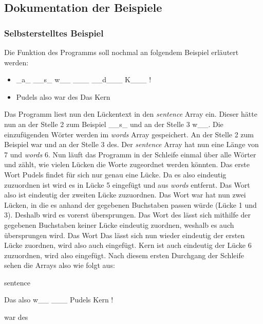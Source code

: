 \documentclass[a4paper, 12pt]{scrartcl}
\begin{document}
\subsection{Dokumentation der Beispiele}

\subsubsection{Selbsterstelltes Beispiel}
Die Funktion des Programms soll nochmal an folgendem Beispiel erläutert werden:
\begin{itemize}
    \item {\_}a{\_} {\_}{\_}s{\_} w{\_}{\_} {\_}{\_}{\_} {\_}{\_}d{\_}{\_}{\_} K{\_}{\_}{\_} !
    \item Pudels also war des Das Kern
\end{itemize}

Das Programm liest nun den Lückentext in den \emph{sentence} Array ein. Dieser hätte nun an der Stelle 2 zum Beispiel {\glqq}\_\_s\_{\grqq} und an der Stelle 3 {\glqq}w\_\_{\grqq}. Die einzufügenden Wörter werden im \emph{words} Array gespeichert. An der Stelle 2 zum Beispiel {\glqq}war{\grqq} und an der Stelle 3 {\glqq}des{\grqq}. Der \emph{sentence} Array hat nun eine Länge von 7 und \emph{words} 6. Nun läuft das Programm in der Schleife einmal über alle Wörter und zählt, wie vielen Lücken die Worte zugeordnet werden könnten. Das erste Wort {\glqq}Pudels{\grqq} findet für sich nur genau eine Lücke. Da es also eindeutig zuzuordnen ist wird es in Lücke 5 eingefügt und  aus  \emph{words} entfernt. Das  Wort {\glqq}also{\grqq} ist  eindeutig  der  zweiten  Lücke zuzuordnen. Das Wort {\glqq}war{\grqq} hat nun zwei Lücken, in die es anhand der gegebenen Buchstaben passen würde (Lücke 1 und 3). Deshalb wird es vorerst übersprungen. Das Wort {\glqq}des{\grqq} lässt sich mithilfe der gegebenen  Buchstaben  keiner  Lücke  eindeutig  zuordnen,  weshalb  es  auch  übersprungen  wird.  Das Wort {\glqq}Das{\grqq} lässt sich nun wieder eindeutig der ersten Lücke zuordnen, wird also auch eingefügt. {\glqq}Kern{\grqq} ist  auch  eindeutig  der  Lücke  6  zuzuordnen,  wird  also  eingefügt.  Nach  diesem  ersten  Durchgang  der Schleife sehen die Arrays also wie folgt aus:

\begin{labeling}{sentence}
    \item [sentence] Das also w{\_}{\_} {\_}{\_}{\_} Pudels Kern !
    \item [words] war des
\end{labeling}
\end{document}
